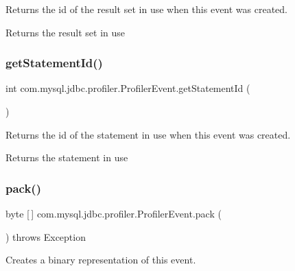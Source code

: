 Returns the id of the result set in use when this event was created.

\begin{DoxyReturn}{Returns}
the result set in use 
\end{DoxyReturn}
\mbox{\label{classcom_1_1mysql_1_1jdbc_1_1profiler_1_1_profiler_event_aa4b1dcf9ac3ed0e242820a1c7f582521}} 
\subsubsection{\texorpdfstring{get\+Statement\+Id()}{getStatementId()}}
{\footnotesize\ttfamily int com.\+mysql.\+jdbc.\+profiler.\+Profiler\+Event.\+get\+Statement\+Id (\begin{DoxyParamCaption}{ }\end{DoxyParamCaption})}

Returns the id of the statement in use when this event was created.

\begin{DoxyReturn}{Returns}
the statement in use 
\end{DoxyReturn}
\mbox{\label{classcom_1_1mysql_1_1jdbc_1_1profiler_1_1_profiler_event_aca4cafacdd420d38a2fbf0213d3e7a43}} 
\subsubsection{\texorpdfstring{pack()}{pack()}}
{\footnotesize\ttfamily byte \mbox{[}$\,$\mbox{]} com.\+mysql.\+jdbc.\+profiler.\+Profiler\+Event.\+pack (\begin{DoxyParamCaption}{ }\end{DoxyParamCaption}) throws Exception}

Creates a binary representation of this event.

